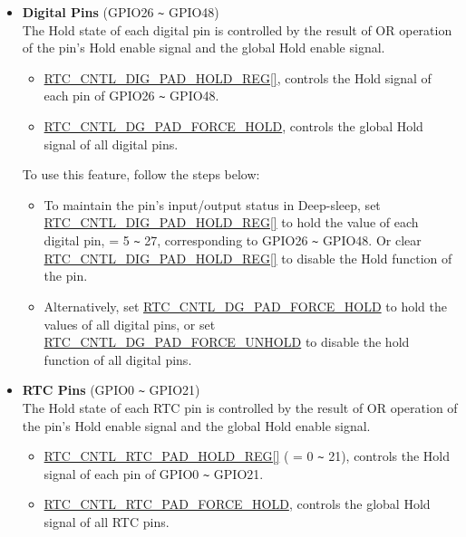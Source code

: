 \documentclass[main\_\_EN.tex]{subfiles}
\begin{document}
\begin{itemize}
    \item \textbf{Digital Pins} (GPIO26 \verb+~+ GPIO48)\\
    The Hold state of each digital pin is controlled by the result of OR operation of the pin's Hold enable signal and the global Hold enable signal.
    \begin{itemize}
    \item \hyperref[regdesc:RTCCNTLDIGPADHOLDREG] {RTC\_CNTL\_DIG\_PAD\_HOLD\_REG[]}, controls the Hold signal of each pin of GPIO26 \verb+~+ GPIO48.
    \item \hyperref[fielddesc:RTCCNTLDGPADFORCEHOLD]{RTC\_CNTL\_DG\_PAD\_FORCE\_HOLD}, controls the global Hold signal of all digital pins.
\end{itemize}
To use this feature, follow the steps below:
\begin{itemize}
        \item To maintain the pin's input/output status in Deep-sleep, set \hyperref[regdesc:RTCCNTLDIGPADHOLDREG] {RTC\_CNTL\_DIG\_PAD\_HOLD\_REG[]} to hold the value of each digital pin,  = 5 \verb+~+ 27, corresponding to GPIO26 \verb+~+ GPIO48. Or clear \hyperref[regdesc:RTCCNTLDIGPADHOLDREG]{RTC\_CNTL\_DIG\_PAD\_HOLD\_REG[]} to disable the Hold function of the pin.
        \item Alternatively, set \hyperref[fielddesc:RTCCNTLDGPADFORCEHOLD]{RTC\_CNTL\_DG\_PAD\_FORCE\_HOLD} to hold the values of all digital pins, or set \hyperref[fielddesc:RTCCNTLDGPADFORCEUNHOLD]{RTC\_CNTL\_DG\_PAD\_FORCE\_UNHOLD} to disable the hold function of all digital pins.
    \end{itemize}
\item \textbf{RTC Pins} (GPIO0 \verb+~+ GPIO21)\\
The Hold state of each RTC pin is controlled by the result of OR operation of the pin's Hold enable signal and the global Hold enable signal.
    \begin{itemize}
    \item \hyperref[regdesc:RTCCNTLRTCPADHOLDREG]{RTC\_CNTL\_RTC\_PAD\_HOLD\_REG[]} ( = 0 \verb+~+ 21), controls the Hold signal of each pin of GPIO0 \verb+~+ GPIO21.
    \item \hyperref[fielddesc:RTCCNTLRTCPADFORCEHOLD]{RTC\_CNTL\_RTC\_PAD\_FORCE\_HOLD}, controls the global Hold signal of all RTC pins.
\end{itemize}


\end{itemize}
\end{document}
